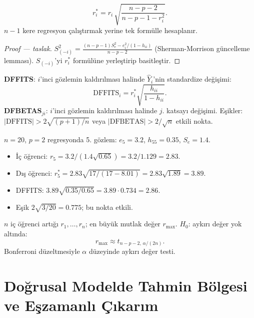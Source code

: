 \begin{teorem}\label{thm:dis_artik}
\[
  r_i^* = r_i\,\sqrt{\frac{n-p-2}{n-p-1-r_i^2}}.
\]
$n-1$ kere regresyon çalıştırmak yerine tek formülle hesaplanır.
\end{teorem}

\begin{proof}[Proof --- taslak]
$S_{(-i)}^2 = \frac{(n-p-1)S_e^2 - e_i^2/(1-h_{ii})}{n-p-2}$ (Sherman-Morrison güncelleme lemması). $S_{(-i)}$'yi $r_i^*$ formülüne yerleştirip basitleştir.
\end{proof}

\begin{tanim}\label{def:dffits}
\textbf{DFFITS}: $i$'inci gözlemin kaldırılması halinde $\hat Y_i$'nin standardize değişimi:
\[
  \mathrm{DFFITS}_i = r_i^*\sqrt{\frac{h_{ii}}{1-h_{ii}}}.
\]
\textbf{DFBETAS}$_{ji}$: $i$'inci gözlemin kaldırılması halinde $j$. katsayı değişimi. Eşikler: $|\mathrm{DFFITS}|>2\sqrt{(p+1)/n}$ veya $|\mathrm{DFBETAS}|>2/\sqrt{n}$ etkili nokta.
\end{tanim}

\begin{ornek}
$n=20$, $p=2$ regresyonda 5. gözlem: $e_5=3.2$, $h_{55}=0.35$, $S_e=1.4$.
\begin{itemize}
  \item İç öğrenci: $r_5=3.2/(1.4\sqrt{0.65})=3.2/1.129=2.83$.
  \item Dış öğrenci: $r_5^*=2.83\sqrt{17/(17-8.01)}=2.83\sqrt{1.89}=3.89$.
  \item DFFITS: $3.89\sqrt{0.35/0.65}=3.89\cdot0.734=2.86$.
  \item Eşik $2\sqrt{3/20}=0.775$; bu nokta etkili.
\end{itemize}
\end{ornek}

\begin{teorem}\label{thm:aykiri_deger}
$n$ iç öğrenci artığı $r_1,\ldots,r_n$; en büyük mutlak değer $r_{\max}$. $H_0$: aykırı değer yok altında:
\[
  r_{\max} \approx t_{n-p-2,\,\alpha/(2n)}.
\]
Bonferroni düzeltmesiyle $\alpha$ düzeyinde aykırı değer testi.
\end{teorem}

\section{Doğrusal Modelde Tahmin Bölgesi ve Eşzamanlı Çıkarım}
\label{sec:tahmibolgesi}

